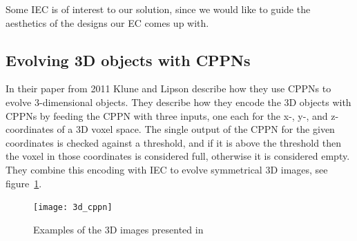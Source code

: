 Some IEC is of interest to our solution, since we would like to guide the aesthetics of the designs our EC comes up with. 

\subsection{Evolving 3D objects with CPPNs}
In their paper from 2011 Klune and Lipson describe how they use CPPNs to evolve 3-dimensional objects\cite{Clune:2011:EOG:2078245.2078246}.
They describe how they encode the 3D objects with CPPNs by feeding the CPPN with three inputs, one each for the x-, y-, and z-coordinates of a 3D voxel space.
The single output of the CPPN for the given coordinates is checked against a threshold, and if it is above the threshold then the voxel in those coordinates is considered full, otherwise it is considered empty\cite[p.~5]{Clune:2011:EOG:2078245.2078246}.
They combine this encoding with IEC to evolve symmetrical 3D images, see figure~\ref{fig:3dobjects}.
\begin{figure}[ht]
\centering
\texttt{[image: 3d\_cppn]}
\caption{Examples of the 3D images presented in \cite{Clune:2011:EOG:2078245.2078246}}
\label{fig:3dobjects}
\end{figure}

